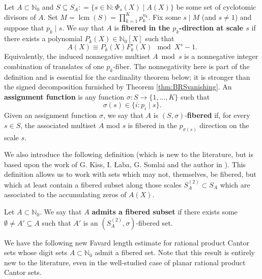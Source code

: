 \documentclass[12pt]{amsart}
\numberwithin{equation}{section}
\DeclareMathOperator{\lcm}{lcm}
\begin{document}
\begin{definition}\label{def:fiberedandassignmentfunct}
Let $A \subset \mathbb{N}_{0}$ and
$
S \subseteq S_A : = \{s \in \mathbb{N} : \Phi_s (X) \mid A(X) \}
$
be some set of cyclotomic divisors of $A$. Set $M = \lcm (S) = \prod_{k=1}^{K} p_k^{n_k}$. Fix some $ s \mid M$ (and $s \neq 1$) and suppose that $p_k \mid s$. We say that $A$ is \textbf{fibered in the $p_k$-direction at scale $s$} if there exists a polynomial $P_k (X) \in \mathbb{N}_0[X]$ such that
$$
A(X) \equiv P_k (X) F_k^s (X) \mod X^s - 1.
$$
Equivalently, the induced nonnegative multiset $A\bmod s$ is a nonnegative integer combination of translates of one $p_k$-fiber.  The nonnegativity here is part of the definition and is essential for the cardinality theorem below; it is stronger than the signed decomposition furnished by Theorem \ref{thm:BRSvanishing}.
An \textbf{assignment function} is any function $\sigma : S \rightarrow \{1,...,K\}$ such that $$\sigma (s) \in \{i : p_i \mid s \}.$$
Given an assignment function $\sigma$, we say that $A$ is $(S , \sigma)$-\textbf{fibered} if, for every $s \in S$, the associated multiset $A$ mod $s$ is fibered in the $p_{\sigma(s)}$ direction on the scale $s$. 
\end{definition}

We also introduce the following definition (which is new to the literature, but is based upon the work of G. Kiss, I. {\L}aba, G. Somlai and the author in \cite{KLMS}). This definition allows us to work with sets which may not, themselves, be fibered, but which at least contain a fibered subset along those scales $S_A^{(2)} \subset S_A$ which are associated to the accumulating zeros of $A(X)$.

\begin{definition}\label{def:persistentfiber}
Let $A \subset \mathbb{N}_0$.
We say that $A$ \textbf{admits a fibered subset} if there exists some $\emptyset \neq A' \subseteq A$ such that $A'$ is an $(S_A^{(2)}, \sigma)$-fibered set.
\end{definition}

We have the following new Favard length estimate for rational product Cantor sets whose digit sets $A \subset \mathbb{N}_0$ admit a fibered set. Note that this result is entirely new to the literature, even in the well-studied case of planar rational product Cantor sets.
\end{document}
